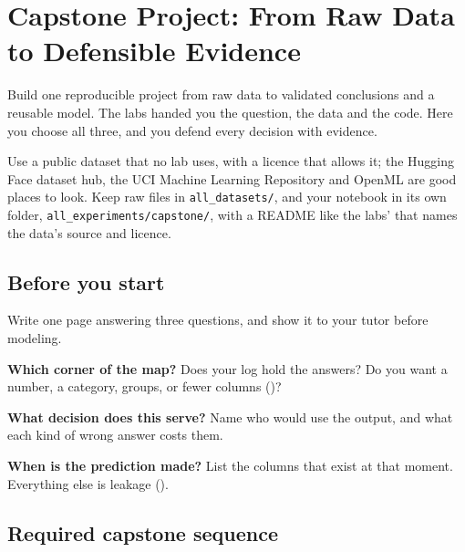 \chapter*{Capstone Project: From Raw Data to Defensible Evidence}
{}

Build one reproducible project from raw data to validated conclusions and a reusable model. The labs handed you the question, the data and the code. Here you choose all three, and you defend every decision with evidence.

\begin{coursechoice}
Use a public dataset that no lab uses, with a licence that allows it; the Hugging Face dataset hub, the UCI Machine Learning Repository and OpenML are good places to look. Keep raw files in \texttt{all\_datasets/}, and your notebook in its own folder, \texttt{all\_experiments/\allowbreak capstone/}, with a README like the labs' that names the data's source and licence.
\end{coursechoice}

\section*{Before you start}

Write one page answering three questions, and show it to your tutor before modeling.

\begin{utpsteps}
  \item \textbf{Which corner of the map?} Does your log hold the answers? Do you want a number, a category, groups, or fewer columns ()?
  \item \textbf{What decision does this serve?} Name who would use the output, and what each kind of wrong answer costs them.
  \item \textbf{When is the prediction made?} List the columns that exist at that moment. Everything else is leakage ().
\end{utpsteps}

\section*{Required capstone sequence}

